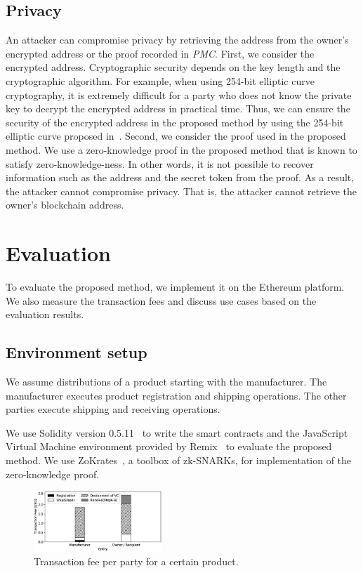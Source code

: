 \documentclass[conference]{IEEEtran}
\begin{document}
\subsection{Privacy}
An attacker can compromise privacy by retrieving the address from the owner's encrypted address or the proof recorded in \textit{PMC}.
First, we consider the encrypted address.
Cryptographic security depends on the key length and the cryptographic algorithm.
For example, when using 254-bit elliptic curve cryptography,  it is extremely difficult for a party who does not know the private key to decrypt the encrypted address in practical time.
Thus, we can ensure the security of the encrypted address in the proposed method by using the 254-bit elliptic curve proposed in~\cite{bjj}.
Second, we consider the proof used in the proposed method.
We use a zero-knowledge proof in the proposed method that is known to satisfy zero-knowledge-ness.
In other words, it is not possible to recover information such as the address and the secret token from the proof.
As a result, the attacker cannot compromise privacy.
That is, the attacker cannot retrieve the owner's blockchain address.


\section{Evaluation}
\label{sec:evaluation}
To evaluate the proposed method, we implement it on the Ethereum platform. We also measure the transaction fees and discuss use cases based on the evaluation results.

\subsection{Environment setup}
We assume distributions of a product starting with the manufacturer.
The manufacturer executes product registration and shipping operations.
The other parties execute shipping and receiving operations.

We use Solidity version 0.5.11~\cite{Solidity} to write the smart contracts and the JavaScript Virtual Machine environment provided by Remix~\cite{Remix} to evaluate the proposed method.
We use ZoKrates~\cite{ZoKrates}, a toolbox of zk-SNARKs, for implementation of the zero-knowledge proof.

\begin{figure}[t]
    \centering
    \includegraphics[width=0.43\textwidth]{graph.eps}
    \caption{Transaction fee per party for a certain product.\label{fig:evaluation}}
\end{figure}
\end{document}
